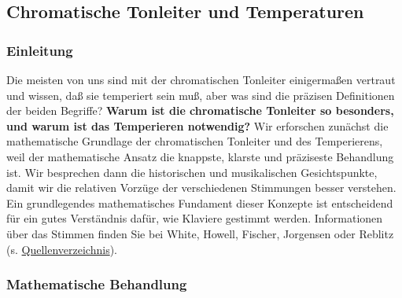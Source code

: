 
\subsection{Chromatische Tonleiter und Temperaturen}
\label{c2_2}

\subsubsection{Einleitung}
\label{c2_2a}

Die meisten von uns sind mit der chromatischen Tonleiter einigermaßen vertraut und wissen, daß sie temperiert sein muß, aber was sind die präzisen Definitionen der beiden Begriffe?
\textbf{Warum ist die chromatische Tonleiter so besonders, und warum ist das Temperieren notwendig?}
Wir erforschen zunächst die mathematische Grundlage der chromatischen Tonleiter und des Temperierens, weil der mathematische Ansatz die knappste, klarste und präziseste Behandlung ist.
Wir besprechen dann die historischen und musikalischen Gesichtspunkte, damit wir die relativen Vorzüge der verschiedenen Stimmungen besser verstehen.
Ein grundlegendes mathematisches Fundament dieser Konzepte ist entscheidend für ein gutes Verständnis dafür, wie Klaviere gestimmt werden.
Informationen über das Stimmen finden Sie bei White, Howell, Fischer, Jorgensen oder Reblitz (s. \hyperref[reference]{Quellenverzeichnis}).
 

\label{c2_2b}

\subsubsection{Mathematische Behandlung}
\label{c2_2_math}

